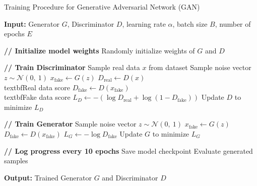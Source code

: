\begin{algorithm}
\caption{Training Procedure for Generative Adversarial Network (GAN)}
\label{alg:gan_training}
\noindent\textbf{Input:} Generator $G$, Discriminator $D$, learning rate $\alpha$, batch size $B$, number of epochs $E$
\begin{algorithmic}[1]

\State \textbf{// Initialize model weights}
\State Randomly initialize weights of $G$ and $D$


        \State \textbf{// Train Discriminator}
        \State Sample real data $x$ from dataset
        \State Sample noise vector $z \sim \mathcal{N}(0,\ 1)$
        \State $x_{\text{fake}} \gets G(z)$
        \State $D_{\text{real}} \gets D(x)$ \\textbf{Real data score}
        \State $D_{\text{fake}} \gets D(x_{\text{fake}})$ \\textbf{Fake data score}
        \State $L_D \gets - \left( \log D_{\text{real}} + \log(1 - D_{\text{fake}}) \right)$
        \State Update $D$ to minimize $L_D$

        \State \textbf{// Train Generator}
        \State Sample noise vector $z \sim \mathcal{N}(0,\ 1)$
        \State $x_{\text{fake}} \gets G(z)$
        \State $D_{\text{fake}} \gets D(x_{\text{fake}})$
        \State $L_G \gets - \log D_{\text{fake}}$
        \State Update $G$ to minimize $L_G$

        \State \textbf{// Log progress every 10 epochs}
            \State Save model checkpoint
            \State Evaluate generated samples
        \EndIf

    \EndFor
\EndFor

\end{algorithmic}
\noindent\textbf{Output:} Trained Generator $G$ and Discriminator $D$
\end{algorithm}
